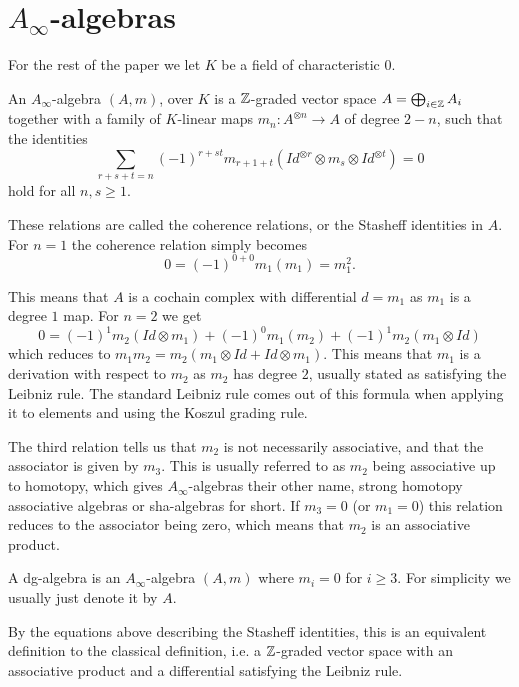 \section{\texorpdfstring{$A_\infty$}{A}-algebras}

For the rest of the paper we let $K$ be a field of characteristic $0$. 

\begin{definition}
    An $A_\infty$-algebra $(A, m)$, over $K$ is a $\mathbb{Z}$-graded vector 
    space $A=\bigoplus_{i\in \mathbb{Z}}A_i$ together with a family of $K$-linear maps 
    $m_n : A^{\otimes n}\longrightarrow A$ of degree $2-n$, such that the identities
    $$\sum_{r+s+t = n}(-1)^{r+st}m_{r+1+t} (Id^{\otimes r}\otimes m_s \otimes Id^{\otimes t}) = 0$$
    hold for all $n, s\geq 1$.
\end{definition}

These relations are called the coherence relations, or the Stasheff identities in $A$. 
For $n=1$ the coherence relation simply becomes $$0 = (-1)^{0+0}m_1 (m_1) = m_1^2 .$$

This means that $A$ is a cochain complex with differential $d=m_1$ as $m_1$ is a degree 
$1$ map. For $n=2$ we get
$$0 = (-1)^{1}m_2(Id\otimes m_1)+(-1)^{0}m_1 (m_2)+(-1)^{1}m_2 (m_1\otimes Id)$$
which reduces to $m_1 m_2 = m_2(m_1\otimes Id + Id\otimes m_1)$. This means that $m_1$ is 
a derivation with respect to $m_2$ as $m_2$ has degree $2$, usually stated as satisfying 
the Leibniz rule. The standard Leibniz rule comes out of this formula when applying it to 
elements and using the Koszul grading rule.

The third relation tells us that $m_2$ is not necessarily associative, and that the 
associator is given by $m_3$. This is usually referred to as $m_2$ being associative up 
to homotopy, which gives $A_\infty$-algebras their other name, strong homotopy associative 
algebras or sha-algebras for short. If $m_3=0$ (or $m_1=0$) this relation reduces to the 
associator being zero, which means that $m_2$ is an associative product. 

\begin{definition}
    A dg-algebra is an $A_\infty$-algebra $(A, m)$ where $m_i = 0$ for 
    $i \geq 3$. For simplicity we usually just denote it by $A$. 
\end{definition}

By the equations above describing the Stasheff identities, this is an equivalent 
definition to the classical definition, i.e. a $\mathbb{Z}$-graded vector space with an 
associative product and a differential satisfying the Leibniz rule. 

